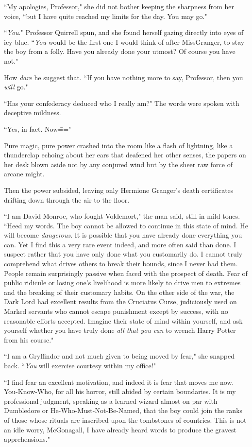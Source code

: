 ``My apologies, Professor," she did not bother keeping the sharpness from her voice, ``but I have quite reached my limits for the day. You may go."

``\emph{You}." Professor Quirrell spun, and she found herself gazing directly into eyes of icy blue. ``\emph{You} would be the first one I would think of after Miss\?Granger, to stay the boy from a folly. Have you already done your utmost? Of course you have not."

How \emph{dare} he suggest that. ``If you have nothing more to say, Professor, then you \emph{will} go."

``Has your confederacy deduced who I really am?" The words were spoken with deceptive mildness.

``Yes, in fact. Now\==="

Pure magic, pure power crashed into the room like a flash of lightning, like a thunderclap echoing about her ears that deafened her other senses, the papers on her desk blown aside not by any conjured wind but by the sheer raw force of arcane might.

Then the power subsided, leaving only Hermione Granger's death certificates drifting down through the air to the floor.

``I am David Monroe, who fought Voldemort," the man said, still in mild tones. ``Heed my words. The boy cannot be allowed to continue in this state of mind. He will become \emph{dangerous}. It is possible that you have already done everything you can. Yet I find this a very rare event indeed, and more often said than done. I suspect rather that you have only done what you customarily do. I cannot truly comprehend what drives others to break their bounds, since I never had them. People remain surprisingly passive when faced with the prospect of death. Fear of public ridicule or losing one's livelihood is more likely to drive men to extremes and the breaking of their customary habits. On the other side of the war, the Dark Lord had excellent results from the Cruciatus Curse, judiciously used on Marked servants who cannot escape punishment except by success, with no reasonable efforts accepted. Imagine their state of mind within yourself, and ask yourself whether you have truly done \emph{all that you can} to wrench Harry Potter from his course."

``I am a Gryffindor and not much given to being moved by fear," she snapped back. ``\emph{You} will exercise courtesy within my office!"

``I find fear an excellent motivation, and indeed it is fear that moves me now. You-Know-Who, for all his horror, still abided by certain boundaries. It is my professional judgment, speaking as a learned wizard almost on par with Dumbledore or He-Who-Must-Not-Be-Named, that the boy could join the ranks of those whose rituals are inscribed upon the tombstones of countries. This is not an idle worry, McGonagall, I have already heard words to produce the gravest apprehensions."

